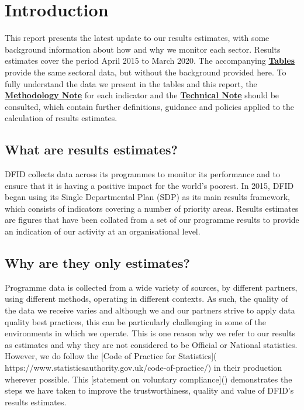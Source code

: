 \chapter*{Introduction}

\thispagestyle{empty}

This report presents the latest update to our results estimates, with some background information about how and why we monitor each sector. %
Results estimates cover the period April 2015 to March 2020. %
The accompanying \href{Tables}{\textbf{Tables}} provide the same sectoral data, but without the background provided here. %
To fully understand the data we present in the tables and this report, the \href{Methodology Note}{\textbf{Methodology Note}} for each indicator and the \href{Technical Note}{\textbf{Technical Note}} should be consulted, which contain further definitions, guidance and policies applied to the calculation of results estimates. %


\section*{What are results estimates?}
DFID collects data across its programmes to monitor its performance and to ensure that it is having a positive impact for the world's poorest. %
In 2015, DFID began using its Single Departmental Plan (SDP) as its main results framework, which consists of indicators covering a number of priority areas. %
Results estimates are figures that have been collated from a set of our programme results to provide an indication of our activity at an organisational level. %

\section*{Why are they only estimates?}
Programme data is collected from a wide variety of sources, by different partners, using different methods, operating in different contexts. %
As such, the quality of the data we receive varies and although we and our partners strive to apply data quality best practices, this can be particularly challenging in some of the environments in which we operate. %
This is one reason why we refer to our results as estimates and why they are not considered to be Official or National statistics. %
However, we do follow the [Code of Practice for Statistics]( https://www.statisticsauthority.gov.uk/code-of-practice/) in their production wherever possible.  This [statement on voluntary compliance]() demonstrates the steps we have taken to improve the trustworthiness, quality and value of DFID’s results estimates. %

